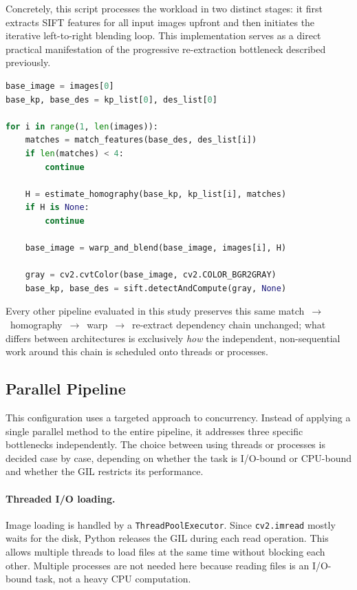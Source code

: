 \documentclass[10pt,twocolumn,letterpaper]{article}
\begin{document}
Concretely, this script processes the workload in two distinct stages: it 
first extracts SIFT features for all input images upfront and then initiates 
the iterative left-to-right blending loop. This implementation serves as a 
direct practical manifestation of the progressive re-extraction bottleneck 
described previously.

\begin{lstlisting}[language=Python, basicstyle=\small\ttfamily, frame=single, breaklines=true, breakatwhitespace=true, caption={Core sequential fold in \texttt{sequential.py}: each iteration strictly depends on the panorama state produced by the previous one.}]
base_image = images[0]
base_kp, base_des = kp_list[0], des_list[0]

for i in range(1, len(images)):
    matches = match_features(base_des, des_list[i])
    if len(matches) < 4:
        continue

    H = estimate_homography(base_kp, kp_list[i], matches)
    if H is None:
        continue

    base_image = warp_and_blend(base_image, images[i], H)

    gray = cv2.cvtColor(base_image, cv2.COLOR_BGR2GRAY)
    base_kp, base_des = sift.detectAndCompute(gray, None)
\end{lstlisting}

Every other pipeline evaluated in this study preserves this same
match~$\rightarrow$~homography~$\rightarrow$~warp~$\rightarrow$~re-extract
dependency chain unchanged; what differs between architectures is exclusively
\emph{how} the independent, non-sequential work around this chain is
scheduled onto threads or processes.

\subsection{Parallel Pipeline}
This configuration uses a targeted approach to concurrency. Instead of 
applying a single parallel method to the entire pipeline, it addresses 
three specific bottlenecks independently. The choice between using threads 
or processes is decided case by case, depending on whether the task is 
I/O-bound or CPU-bound and whether the GIL restricts its performance.

\paragraph{Threaded I/O loading.} Image loading is handled by a
\texttt{ThreadPoolExecutor}. Since \texttt{cv2.imread} mostly waits for
the disk, Python releases the GIL during each read operation. This allows
multiple threads to load files at the same time without blocking each
other. Multiple processes are not needed here because reading files is
an I/O-bound task, not a heavy CPU computation.
\end{document}
